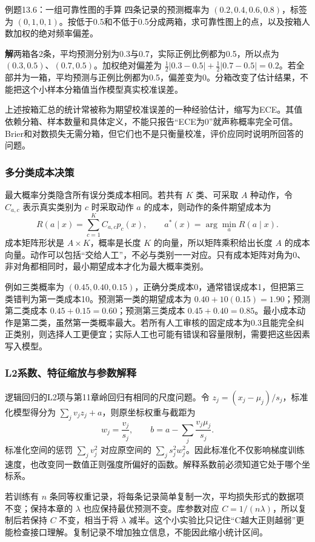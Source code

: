 \documentclass[UTF8,fontset=none,zihao=-4,a4paper]{ctexart}
\newcommand{\sol}{\par\noindent\textbf{解}\quad}
\numberwithin{equation}{section}
\numberwithin{figure}{section}
\begin{document}
\begin{infobox}[unbreakable]{例题13.6：一组可靠性图的手算}
四条记录的预测概率为 $(0.2,0.4,0.6,0.8)$，标签为 $(0,1,0,1)$。按低于0.5和不低于0.5分成两箱，求可靠性图上的点，以及按箱人数加权的绝对频率偏差。
\sol 两箱各2条，平均预测分别为0.3与0.7，实际正例比例都为0.5，所以点为 $(0.3,0.5)$、$(0.7,0.5)$。加权绝对偏差为 $\tfrac12|0.3-0.5|+\tfrac12|0.7-0.5|=0.2$。若全部并为一箱，平均预测与正例比例都为0.5，偏差变为0。分箱改变了估计结果，不能把这个小样本分箱值当作模型真实校准误差。
\end{infobox}
上述按箱汇总的统计常被称为期望校准误差的一种经验估计，缩写为ECE。其值依赖分箱、样本数量和具体定义，不能只报告“ECE为0”就声称概率完全可信。Brier和对数损失无需分箱，但它们也不是只衡量校准，评价应同时说明所回答的问题。

\subsubsection{多分类成本决策}
最大概率分类隐含所有误分类成本相同。若共有 $K$ 类、可采取 $A$ 种动作，令 $C_{a,c}$ 表示真实类别为 $c$ 时采取动作 $a$ 的成本，则动作的条件期望成本为
\[
 R(a\mid x)=\sum_{c=1}^K C_{a,c}p_c(x),\qquad
 a^*(x)=\arg\min_a R(a\mid x).
\]
成本矩阵形状是 $A\times K$，概率是长度 $K$ 的向量，所以矩阵乘积给出长度 $A$ 的成本向量。动作可以包括“交给人工”，不必与类别一一对应。只有成本矩阵对角为0、非对角都相同时，最小期望成本才化为最大概率类别。

例如三类概率为 $(0.45,0.40,0.15)$，正确分类成本0，通常错误成本1，但把第三类错判为第一类成本10。预测第一类的期望成本为 $0.40+10(0.15)=1.90$；预测第二类成本 $0.45+0.15=0.60$；预测第三类成本 $0.45+0.40=0.85$。最小成本动作是第二类，虽然第一类概率最大。若所有人工审核的固定成本为0.3且能完全纠正类别，则选择人工更便宜；实际人工也可能有错误和容量限制，需要把这些因素写入模型。

\subsubsection{L2系数、特征缩放与参数解释}
逻辑回归的L2项与第11章岭回归有相同的尺度问题。令 $z_j=(x_j-\mu_j)/s_j$，标准化模型得分为 $\sum_jv_jz_j+a$，则原坐标权重与截距为
\[
 w_j=\frac{v_j}{s_j},\qquad b=a-\sum_j\frac{v_j\mu_j}{s_j}.
\]
标准化空间的惩罚 $\sum_jv_j^2$ 对应原空间的 $\sum_js_j^2w_j^2$。因此标准化不仅影响梯度训练速度，也改变同一数值正则强度所偏好的函数。解释系数前必须知道它处于哪个坐标系。

若训练有 $n$ 条同等权重记录，将每条记录简单复制一次，平均损失形式的数据项不变；保持本章的 $\lambda$ 也应保持最优预测不变。库参数对应 $C=1/(n\lambda)$，所以复制后若保持 $C$ 不变，相当于将 $\lambda$ 减半。这个小实验比只记住“C越大正则越弱”更能检查接口理解。复制记录不增加独立信息，不能因此缩小统计区间。
\end{document}
